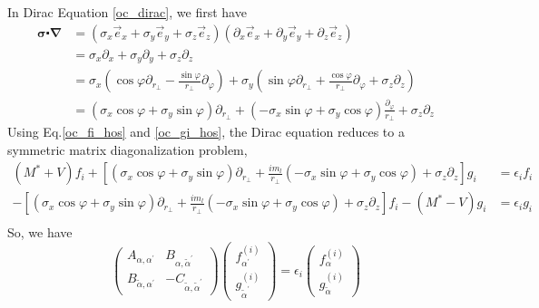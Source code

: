 In Dirac Equation \eqref{oc_dirac}, we first have
\begin{equation}
\begin{aligned}
  \boldsymbol{\sigma} \centerdot \boldsymbol{\nabla} &= (\sigma_x \vec{e}_x + \sigma_y \vec{e}_y + \sigma_z\vec{e}_z )(\partial_x\vec{e}_x + \partial_y \vec{e}_y + \partial_z\vec{e}_z ) \\
  &= \sigma_x\partial_x + \sigma_y\partial_y + \sigma_z\partial_z \\
  &= \sigma_x\left( \cos\varphi \partial_{r_{\perp}} - \frac{\sin\varphi}{r_{\perp}} \partial_{\varphi}  \right) + \sigma_y\left( \sin\varphi\partial_{r_{\perp}} + \frac{\cos\varphi}{r_{\perp}}\partial_{\varphi} + \sigma_z\partial_z \right) \\
  &= (\sigma_x\cos\varphi + \sigma_y\sin\varphi) \partial_{r_{\perp}} + (-\sigma_x\sin\varphi + \sigma_y\cos\varphi)\frac{\partial_{\varphi}}{r_{\perp}} + \sigma_z\partial_z
\end{aligned}
\end{equation}
Using Eq.\eqref{oc_fi_hos} and \eqref{oc_gi_hos}, the Dirac equation reduces to a symmetric matrix diagonalization problem, 
\begin{equation}
\begin{aligned}
  (M^* + V)f_i + \left[ (\sigma_x\cos\varphi + \sigma_y\sin\varphi)\partial_{r_{\perp}} + \frac{im_l}{r_{\perp}}(-\sigma_x\sin\varphi + \sigma_y\cos\varphi) + \sigma_z\partial_z \right] g_i &= \epsilon_i f_i \\
  -\left[ (\sigma_x\cos\varphi + \sigma_y\sin\varphi)\partial_{r_{\perp}} + \frac{im_l}{r_{\perp}}(-\sigma_x\sin\varphi + \sigma_y\cos\varphi) + \sigma_z\partial_z \right] f_i - (M^* - V)g_i &= \epsilon_i g_i \\
\end{aligned}
\end{equation}
So, we have
\begin{equation}
\left(\begin{array}{cc}
  A_{\alpha, \alpha^{\prime}}         & B_{\alpha, \tilde{\alpha}^{\prime}} \\
  B_{\tilde{\alpha}, \alpha^{\prime}} & -C_{\tilde{\alpha}, \tilde{\alpha}^{\prime}}
  \end{array}\right)
  \left(\begin{array}{l}
    f_{\alpha^{\prime}}^{(i)} \\
    g_{\tilde{\alpha}^{\prime}}^{(i)}
  \end{array}\right)
  =\epsilon_{i}
  \left(\begin{array}{c}
    f_{\alpha}^{(i)} \\
    g_{\tilde{\alpha}}^{(i)}
  \end{array}\right)
\end{equation}
